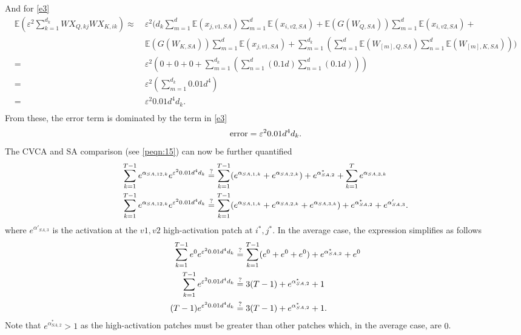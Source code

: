 And for \ref{e3}
\begin{equation}
\begin{aligned}
    \mathbb{E} (\varepsilon^2 \sum_{k=1}^{d_k} WX_{Q,kj} WX_{K,ik}) \approx &\ \varepsilon^2 (d_k \sum_{m=1}^{d} \mathbb{E} (x_{j,v1,SA}) \sum_{m=1}^{d} \mathbb{E} (x_{i,v2,SA}) + \mathbb{E} (G(W_{Q,SA})) \sum_{m=1}^{d} \mathbb{E} (x_{i,v2,SA}) + \\
    &\ \mathbb{E} (G(W_{K,SA})) \sum_{m=1}^{d} \mathbb{E} (x_{j,v1,SA}) + \sum_{m=1}^{d_k} (\sum_{n=1}^{d} \mathbb{E} (W_{[m],Q,SA}) \sum_{n=1}^{d} \mathbb{E} (W_{[m],K,SA}))) \\
    = &\ \varepsilon^2 (0 + 0 + 0 + \sum_{m=1}^{d_k} (\sum_{n=1}^{d} (0.1 d) \sum_{n=1}^{d} (0.1 d))) \\
    = &\ \varepsilon^2 (\sum_{m=1}^{d_k} 0.01 d^4) \\
    = &\ \varepsilon^2 0.01 d^4 d_k. \\
\end{aligned}
\end{equation}
From these, the error term is dominated by the term in \ref{e3}
\begin{equation}
    \text{error} = \varepsilon^2 0.01 d^4 d_k. \\
\end{equation}
The CVCA and SA comparison (see \ref{peqn:15}) can now be further quantified
\begin{equation}
\begin{aligned}
    \sum_{k=1}^{T-1} e^{\alpha_{SA,12,k}} e^{\varepsilon^2 0.01 d^4 d_k} & \stackrel{?}{=} \sum_{k=1}^{T-1} (e^{\alpha_{SA,1,k}} + e^{\alpha_{SA,2,k}}) + e^{\alpha^*_{SA,2}} + \sum_{k=1}^{T} e^{\alpha_{SA,3,k}} \\
    \sum_{k=1}^{T-1} e^{\alpha_{SA,12,k}} e^{\varepsilon^2 0.01 d^4 d_k} & \stackrel{?}{=} \sum_{k=1}^{T-1} (e^{\alpha_{SA,1,k}} + e^{\alpha_{SA,2,k}} + e^{\alpha_{SA,3,k}}) + e^{\alpha^*_{SA,2}} + e^{\alpha'_{SA,3}}. \\
\end{aligned}
\end{equation}
where $e^{\alpha'_{SA,3}}$ is the activation at the $v1,v2$ high-activation patch at $i^*,j^*$. In the average case, the expression simplifies as follows
\begin{equation}
\begin{aligned}
    \sum_{k=1}^{T-1} e^{0} e^{\varepsilon^2 0.01 d^4 d_k} & \stackrel{?}{=} \sum_{k=1}^{T-1} (e^{0} + e^{0} + e^{0}) + e^{\alpha^*_{SA,2}} + e^{0} \\
    \sum_{k=1}^{T-1} e^{\varepsilon^2 0.01 d^4 d_k} & \stackrel{?}{=} 3 (T-1) + e^{\alpha^*_{SA,2}} + 1 \\
    (T-1) e^{\varepsilon^2 0.01 d^4 d_k} & \stackrel{?}{=} 3 (T-1) + e^{\alpha^*_{SA,2}} + 1. \\
\end{aligned}
\end{equation}
Note that $e^{\alpha^*_{SA,2}} > 1$ as the high-activation patches must be greater than other patches which, in the average case, are $0$.

